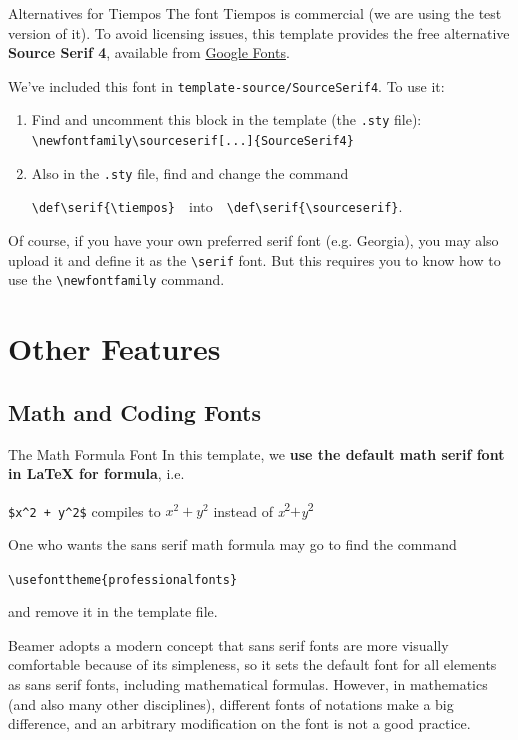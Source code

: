 \documentclass[12pt, aspectratio=169]{beamer}
\begin{document}
\begin{frame}[fragile]{Alternatives for Tiempos}
The font {\serif Tiempos} is commercial (we are using the test version of it). To avoid licensing issues, this template provides the free alternative \textbf{Source Serif 4}, available from \href{https://fonts.google.com/specimen/Source+Serif+4}{\color{SMUBlue}Google Fonts}.

We've included this font in \texttt{template-source/SourceSerif4}. To use it:
\begin{enumerate}
    \item Find and uncomment this block in the template (the \texttt{.sty} file): \verb|\newfontfamily\sourceserif[...]{SourceSerif4}|
    \item Also in the \texttt{.sty} file, find and change the command {\par\centering\verb|\def\serif{\tiempos}|\ \ into\ \ \verb|\def\serif{\sourceserif}|.\par}
\end{enumerate}
Of course, if you have your own preferred serif font (e.g. Georgia), you may also upload it and define it as the \verb|\serif| font. But this requires you to know how to use the \verb|\newfontfamily| command.
\end{frame}


\section{Other Features}
\begin{frame}{\insertsection}
    \tableofcontents[currentsection]
\end{frame}

\subsection{Math and Coding Fonts}

\begin{frame}[fragile]{The Math Formula Font}
In this template, we \textbf{\color{SMUSalmon}use the default math serif font in {\serif\LaTeX} for formula}, i.e.
{\par\centering
\verb|$x^2 + y^2$| compiles to $x^2 + y^2$ instead of \textit{x}\textsuperscript{2}$+$\textit{y}\textsuperscript{2}
\par}
One who wants the sans serif math formula may go to find the command
{\par\centering
\verb|\usefonttheme{professionalfonts}|
\par}
and remove it in the template file.
\begin{alertblock}{}\justifying
Beamer adopts a modern concept that sans serif fonts are more visually comfortable because of its simpleness, so it sets the default font for all elements as sans serif fonts, including mathematical formulas. However, in mathematics (and also many other disciplines), different fonts of notations make a big difference, and an arbitrary modification on the font is not a good practice.
\end{alertblock}

\end{frame}
\end{document}
